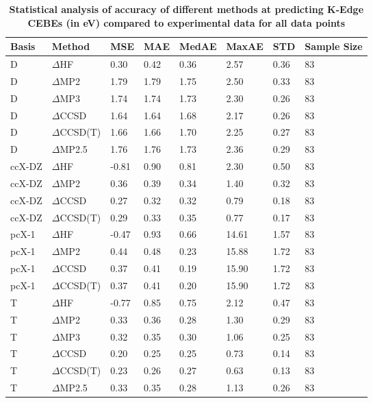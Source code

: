 \begin{table}
  \caption{\textbf{Statistical analysis of accuracy of different methods at predicting K-Edge CEBEs (in eV) compared to experimental data for all data points}}
  \label{tbl:method-all-summary}
  \begin{tabular}{l l l l l l l l }
    \toprule
    \textbf{Basis} & \textbf{Method} & \textbf{MSE} & \textbf{MAE} & \textbf{MedAE} & \textbf{MaxAE} & \textbf{STD} & \textbf{Sample Size} \\ 
    \midrule
    D & $\Delta$HF & 0.30 & 0.42 & 0.36 & 2.57 & 0.36 & 83 \\ 
    D & $\Delta$MP2 & 1.79 & 1.79 & 1.75 & 2.50 & 0.33 & 83 \\ 
    D & $\Delta$MP3 & 1.74 & 1.74 & 1.73 & 2.30 & 0.26 & 83 \\ 
    D & $\Delta$CCSD & 1.64 & 1.64 & 1.68 & 2.17 & 0.26 & 83 \\ 
    D & $\Delta$CCSD(T) & 1.66 & 1.66 & 1.70 & 2.25 & 0.27 & 83 \\ 
    D & $\Delta$MP2.5 & 1.76 & 1.76 & 1.73 & 2.36 & 0.29 & 83 \\ 
    ccX-DZ & $\Delta$HF & -0.81 & 0.90 & 0.81 & 2.30 & 0.50 & 83 \\ 
    ccX-DZ & $\Delta$MP2 & 0.36 & 0.39 & 0.34 & 1.40 & 0.32 & 83 \\ 
    ccX-DZ & $\Delta$CCSD & 0.27 & 0.32 & 0.32 & 0.79 & 0.18 & 83 \\ 
    ccX-DZ & $\Delta$CCSD(T) & 0.29 & 0.33 & 0.35 & 0.77 & 0.17 & 83 \\ 
    pcX-1 & $\Delta$HF & -0.47 & 0.93 & 0.66 & 14.61 & 1.57 & 83 \\ 
    pcX-1 & $\Delta$MP2 & 0.44 & 0.48 & 0.23 & 15.88 & 1.72 & 83 \\ 
    pcX-1 & $\Delta$CCSD & 0.37 & 0.41 & 0.19 & 15.90 & 1.72 & 83 \\ 
    pcX-1 & $\Delta$CCSD(T) & 0.37 & 0.41 & 0.20 & 15.90 & 1.72 & 83 \\ 
    T & $\Delta$HF & -0.77 & 0.85 & 0.75 & 2.12 & 0.47 & 83 \\ 
    T & $\Delta$MP2 & 0.33 & 0.36 & 0.28 & 1.30 & 0.29 & 83 \\ 
    T & $\Delta$MP3 & 0.32 & 0.35 & 0.30 & 1.06 & 0.25 & 83 \\ 
    T & $\Delta$CCSD & 0.20 & 0.25 & 0.25 & 0.73 & 0.14 & 83 \\ 
    T & $\Delta$CCSD(T) & 0.23 & 0.26 & 0.27 & 0.63 & 0.13 & 83 \\ 
    T & $\Delta$MP2.5 & 0.33 & 0.35 & 0.28 & 1.13 & 0.26 & 83 \\ 

\end{tabular}
\end{table}
